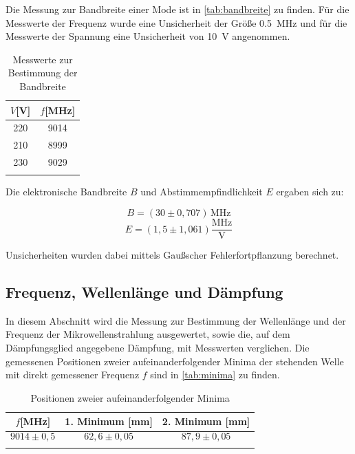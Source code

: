 Die Messung zur Bandbreite einer Mode ist in \autoref{tab:bandbreite} zu finden.
Für die Messwerte der Frequenz wurde eine Unsicherheit der Größe \SI{0,5}{\mega\hertz} und für die Messwerte der Spannung eine Unsicherheit von \SI{10}{\volt} angenommen.

\begin{table}
\centering
\caption{Messwerte zur Bestimmung der Bandbreite}
\begin{tabular}{c c}
\toprule
{$V$[V]} & {$f$[MHz]}\\
\midrule
220&9014\\
210&8999\\
230&9029\\
\bottomrule
\label{tab:bandbreite}
\end{tabular}
\end{table}


Die elektronische Bandbreite $B$ und Abstimmempfindlichkeit $E$ ergaben sich zu:

\begin{equation}
B = (30 \pm 0,707)\,\text{MHz}
\label{eq:bandbreite}
\end{equation}
\begin{equation}
E = (1,5 \pm 1,061) \frac{\text{MHz}}{\text{V}}
\label{eq:elbandbreite}
\end{equation}

Unsicherheiten wurden dabei mittels Gaußscher Fehlerfortpflanzung berechnet.

 







\subsection{Frequenz, Wellenlänge und Dämpfung}
\label{sec:fwd}


In diesem Abschnitt wird die Messung zur Bestimmung der Wellenlänge und der Frequenz der Mikrowellenstrahlung ausgewertet, sowie die, auf dem Dämpfungsglied angegebene Dämpfung, mit Messwerten verglichen.
Die gemessenen Positionen zweier aufeinanderfolgender Minima der stehenden Welle mit direkt gemessener Frequenz $f$ sind in \autoref{tab:minima} zu finden.


\begin{table}
\centering
\caption{Positionen zweier aufeinanderfolgender Minima}
\begin{tabular}{c c c}
\toprule
{$f$[MHz]} & {1. Minimum [mm]}&{2. Minimum [mm]}\\
\midrule
{$$9014\pm 0,5$$}&{$$62,6\pm 0,05$$}&{$$87,9\pm 0,05$$}\\
\bottomrule
\label{tab:minima}
\end{tabular}
\end{table}

